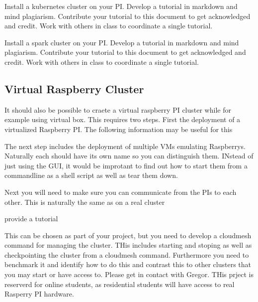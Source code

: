 \begin{exercise}\label{E:.Pi.Cluster.Kubernetes} 
  Install a kubernetes cluster on
  your PI. Develop a tutorial in markdown and mind
  plagiarism. Contribute your tutorial to this document to get
  acknowledged and credit. Work with others in class to coordinate a
  single tutorial.
\end{exercise}
  
\begin{exercise}\label{E:.Pi.Cluster.Spark} 
  Install a spark cluster on your
  PI. Develop a tutorial in markdown and mind plagiarism. Contribute
  your tutorial to this document to get acknowledged and credit. Work
  with others in class to coordinate a single tutorial.
\end{exercise}


\subsection{Virtual Raspberry Cluster}

It should also be possible to craete a virtual raspberry PI cluster
while for example using virtual box. This requires two steps. First
the deployment of a virtualized Raspberry PI. The following
information may be useful for this


The next step includes the deployment of multiple VMs emulating
Raspberrys. Naturally each should have its own name so you can
distinguish them. INstead of just using the GUI, it would be improtant
to find out how to start them from a commandline as a shell script as
well as tear them down.

Next you will need to make sure you can communicate from the PIs to
each other. This is naturally the same as on a real cluster

\begin{exercise}
provide a tutorial 
\end{exercise}

This can be chosen as part of your project, but you need to develop a
cloudmesh command for managing the cluster. THis includes starting and
stoping as well as checkpointing the cluster from a cloudmesh
command. Furthermore you need to benchmark it and identify how to do
this and contrast this to other clusters that you may start or have
access to. Please get in contact with Gregor. THis prject is reserverd
for online students, as residential students will have access to real
Rasperry PI hardware.
